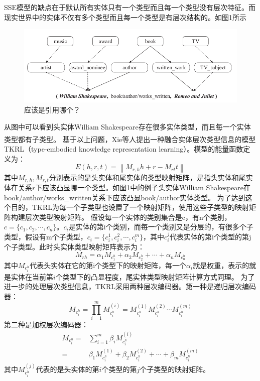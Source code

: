 \documentclass[twocolumn]{article}
\newcommand{\upcite}[1]{\textsuperscript{\textsuperscript{\cite{#1}}}}
\begin{document}
	SSE模型的缺点在于默认所有实体只有一个类型而且每一个类型没有层次特征。而现实世界中的实体不仅有多个类型而且每一个类型是有层次结构的。如图1所示
	\begin{figure}[ht]
		\centering
		\includegraphics[width=\linewidth]{TKRL.png}
		\caption{应该是引用哪个？}
	\end{figure}
	从图中可以看到头实体William Shakespeare存在很多实体类型，而且每一个实体类型都有子类型。
	基于以上问题，Xie等人\upcite{TKRL}提出一种融合实体层次类型信息的模型TKRL（type-embodied knowledge representation learning）。模型的能量函数定义为：
	\begin{equation}
		E(h,r,t)=\left \| M_{r,h}h+r-M_{rt}t \right \|
	\end{equation}
	其中$M_{r,h},M_{r,t}$分别表示的是头实体和尾实体的类型映射矩阵，是指头实体和尾实体在关系$r$下应该凸显哪一个类型。如图1中的例子头实体William Shakespeare在book/author/works\_written关系下应该凸显book/author实体类型。
	为了达到这个目的，TKRL为每一个子类型也设置了一个映射矩阵，使用这些子类型的映射矩阵构建层次类型映射矩阵。
	假设每一个实体的类别集合是c，有n个类别，$c=\{c_1,c_2,\cdots,c_n\}$。$c_i$是实体的第i个类别，而每一个类别又是分层的，有很多个子类型，假设有m个子类型，$c_i=\{c_i^1,c_i^2,\cdots,c_i^m\}$，其中$c_i^j$代表实体的第i个类型的第j个子类型。此时头实体类型映射矩阵表示为：
	\begin{equation}
		M_{rh}=\alpha_1 M_{c_1^h}+\alpha_2 M_{c_2^h}+\cdots+\alpha_n M_{c_n^h}
	\end{equation}
	其中$M_{c_i^h}$代表头实体在它的第i个类型下的映射矩阵，每一个$\alpha_i$就是权重，表示的就是实体在当前第$i$个类型下的凸显程度，尾实体类型映射矩阵计算方式同理。
	为了进一步的处理层次类型信息，TKRL采用两种层次编码器。第一种是递归层次编码器：
	\begin{equation}
		M_{c_i^h}=\prod_{i=1}^{m}M_{c_i^h}^{(i)}=M_{c_i^h}^{(1)}M_{c_i^h}^{(2)}\cdots M_{c_i^h}^{(m)}
	\end{equation}
	第二种是加权层次编码器：
	\begin{equation}
		\begin{split}
		M_{c_i^h}=&\sum_{i=1}^{m}\beta_iM_{c_i^h}^{(i)}\\
		=&\beta_1M_{c_i^h}^{(1)}+\beta_2M_{c_i^h}^{(2)}+\cdots+\beta_mM_{c_i^h}^{(m)}
		\end{split}
	\end{equation}
	其中$M_{c_i^h}^{(j)}$代表的是头实体的第$i$个类型的第$j$个子类型的映射矩阵。
	
\end{document}
